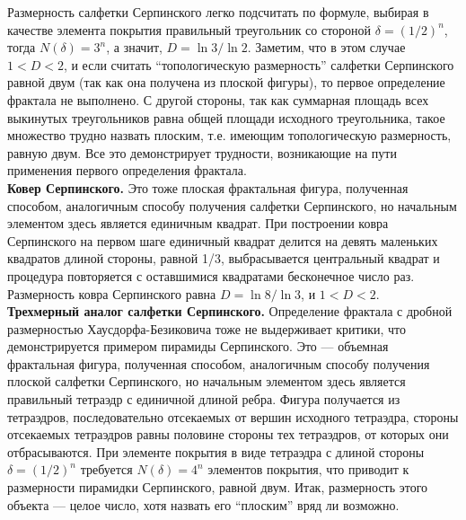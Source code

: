 Размерность салфетки Серпинского легко подсчитать по формуле, выбирая в качестве элемента покрытия правильный треугольник со стороной $\delta = (1/2)^{n}$, тогда $N(\delta) = 3^{n}$, а значит, $D = \ln{3}/\ln{2}$. Заметим, что в этом случае $1 < D < 2$, и если считать ``топологическую размерность'' салфетки Серпинского равной двум (так как она получена из плоской фигуры), то первое определение фрактала не выполнено. С другой стороны, так как суммарная площадь всех выкинутых треугольников равна общей площади исходного треугольника, такое множество трудно назвать плоским, т.е. имеющим топологическую размерность, равную двум. Все это демонстрирует трудности, возникающие на пути применения первого определения фрактала.\\
\textbf{Ковер Серпинского.} Это тоже плоская фрактальная фигура, полученная способом, аналогичным способу получения салфетки Серпинского, но начальным элементом здесь является единичным квадрат. При построении ковра Серпинского на первом шаге единичный квадрат делится на девять маленьких квадратов длиной стороны, равной 1/3, выбрасывается центральный квадрат и процедура повторяется с оставшимися квадратами бесконечное число раз. Размерность ковра Серпинского равна $D = \ln{8}/\ln{3}$, и $1 < D < 2$.\\
\textbf{Трехмерный аналог салфетки Серпинского.} Определение фрактала с дробной размерностью Хаусдорфа-Безиковича тоже не выдерживает критики, что демонстрируется примером пирамиды Серпинского. Это --- объемная фрактальная фигура, полученная способом, аналогичным способу получения плоской салфетки Серпинского, но начальным элементом здесь является правильный тетраэдр с единичной длиной ребра. Фигура получается из тетраэдров, последовательно отсекаемых от вершин исходного тетраэдра, стороны отсекаемых тетраэдров равны половине стороны тех тетраэдров, от которых они отбрасываются. При элементе покрытия в виде тетраэдра с длиной стороны $\delta = (1/2)^{n}$ требуется $N(\delta) = 4^{n}$ элементов покрытия, что приводит к размерности пирамидки Серпинского, равной двум. Итак, размерность этого объекта --- целое число, хотя назвать его ``плоским'' вряд ли возможно.


